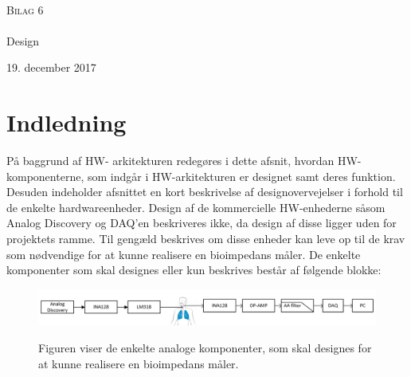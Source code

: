 

\begin{titlingpage}
\begin{center}

~ \\[3cm]

\textsc{\LARGE Bilag 6}\\[1.5cm]


\noindent\makebox[\linewidth]{\rule{\textwidth}{0.4pt}}\\
[0.5cm]{\Huge Design}
\noindent\makebox[\linewidth]{\rule{\textwidth}{0.4pt}}
\end{center}
\vfill
\begin{center}
{\large 19. december 2017}
\end{center}
\end{titlingpage}

\newpage
\tableofcontents*
\newpage

\chapter{Indledning}
På baggrund af HW- arkitekturen redegøres i dette afsnit, hvordan HW-komponenterne, som indgår i HW-arkitekturen er designet samt deres funktion. Desuden indeholder afsnittet en kort beskrivelse af designovervejelser i forhold til de enkelte hardwareenheder. Design af de kommercielle HW-enhederne såsom Analog Discovery og DAQ’en beskriveres ikke, da design af disse ligger uden for projektets ramme.  Til gengæld beskrives om disse enheder kan leve op til de krav som nødvendige for at kunne realisere en bioimpedans måler. De enkelte komponenter som skal designes eller kun beskrives består af følgende blokke: 

\begin{figure}[H]
\centering
{\includegraphics[width=\linewidth]
{Figure/Blokaede}}
\caption{Figuren viser de enkelte analoge komponenter, som skal designes for at kunne realisere en bioimpedans måler.}
\label{ibdfigur}
\end{figure}


